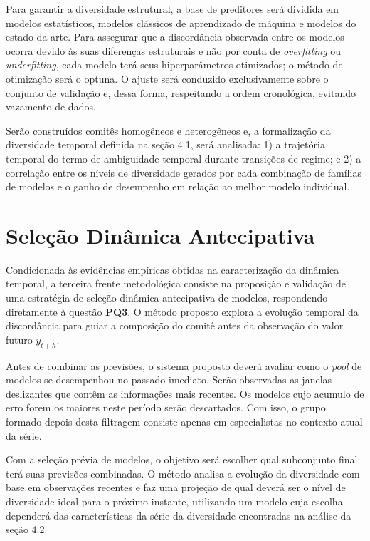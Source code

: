 Para garantir a diversidade estrutural, a base de preditores será dividida em modelos estatísticos, modelos clássicos de aprendizado de máquina e modelos do estado da arte. Para assegurar que a discordância observada entre os modelos ocorra devido às suas diferenças estruturais e não por conta de \textit{overfitting} ou \textit{underfitting}, cada modelo terá seus hiperparâmetros otimizados; o método de otimização será o optuna. O ajuste será conduzido exclusivamente sobre o conjunto de validação e, dessa forma, respeitando a ordem cronológica, evitando vazamento de dados. 

Serão construídos comitês homogêneos e heterogêneos e, a formalização da diversidade temporal definida na seção 4.1, será analisada: 1) a trajetória temporal do termo de ambiguidade temporal durante transições de regime; e 2) a correlação entre os níveis de diversidade gerados por cada combinação de famílias de modelos e o ganho de desempenho em relação ao melhor modelo individual.

\section{Seleção Dinâmica Antecipativa}

Condicionada às evidências empíricas obtidas na caracterização da dinâmica temporal, a terceira frente metodológica consiste na proposição e validação de uma estratégia de seleção dinâmica antecipativa de modelos, respondendo diretamente à questão \textbf{PQ3}. O método proposto explora a evolução temporal da discordância para guiar a composição do comitê antes da observação do valor futuro $y_{t+h}.$ 

Antes de combinar as previsões, o sistema proposto deverá avaliar como o \textit{pool} de modelos se desempenhou no passado imediato. Serão observadas as janelas deslizantes que contêm as informações mais recentes. Os modelos cujo acumulo de erro forem os maiores neste período serão descartados. Com isso, o grupo formado depois desta filtragem consiste apenas em especialistas no contexto atual da série.

Com a seleção prévia de modelos, o objetivo será escolher qual subconjunto final terá suas previsões combinadas. O método analisa a evolução da diversidade com base em observações recentes e faz uma projeção de qual deverá ser o nível de diversidade ideal para o próximo instante, utilizando um modelo cuja escolha dependerá das características da série da diversidade encontradas na análise da seção 4.2. 

